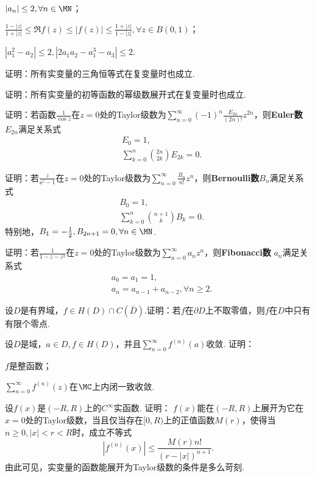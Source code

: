 \begin{xiti}
\begin{enuma}
   \item $|a_n|\le2,\forall n\in \MN$；
   \item $\frac{1-|z|}{1+|z|}\le\Re f(z)\le|f(z)|\le\frac{1+|z|}{1-|z|},\forall
   z\in B(0,1)$；
   \item $|a_1^2-a_2|\le2,|2a_1a_2-a_1^3-a_3|\le2$.
\end{enuma}
\item 证明：所有实变量的三角恒等式在复变量时也成立.
\item 证明：所有实变量的初等函数的幂级数展开式在复变量时也成立.
\item 证明：若函数$\frac1{\cos z}$在$z=0$处的Taylor级数为$\sum_{n=0}^\infty(-1)^n\frac{E_{2n}}{(2n)!}z^{2n}$，则\textbf{Euler数}
    $E_{2n}$满足关系式
    \begin{align*}
      &E_0=1,\\
      &\sum_{k=0}^n\binom{2n}{2k}E_{2k}=0.
    \end{align*}
\item 证明：若$\frac z{\ee^z-1}$在$z=0$处的Taylor级数为$\sum_{n=0}^\infty \frac{B_n}{n!}z^n$，则\textbf{Bernoulli数}$B_n$满足关系式
    \begin{align*}
    &B_0=1,\\
    &\sum_{k=0}^n\binom{n+1}kB_k=0.
    \end{align*}
特别地，$B_1=-\frac12,B_{2n+1}=0,\forall n\in \MN$.
\item 证明：若$\frac1{1-z-z^2}$在$z=0$处的Taylor级数为$\sum_{n=0}^\infty a_nz^n$，则\textbf{Fibonacci数} $a_n$满足关系式
    \begin{align*}
    &a_0=a_1=1,\\
    &a_n=a_{n-1}+a_{n-2},\forall n\ge2.
    \end{align*}
\item 设$D$是有界域，$f\in H(D)\cap C(\bar D)$.证明：若$f$在$\partial D$上不取零值，则$f$在$D$中只有有限个零点.
\item 设$D$是域，$a\in D,f\in H(D)$，并且$\sum_{n=0}^\infty f^{(n)}(a)$收敛. 证明：
\begin{enuma}
  \item $f$是整函数；
  \item $\sum_{n=0}^\infty f^{(n)}(z)$在$\MC$上内闭一致收敛.
\end{enuma}
\item 设$f(x)$是$(-R,R)$上的$C^\infty$实函数. 证明： $f(x)$能在$(-R,R)$上展开为它在$x=0$处的Taylor级数，当且仅当存在$[0,R)$上的正值函数$M(r)$，使得当$n\ge0,|x|<r<R$时，成立不等式
    \[|f^{(n)}(x)|\le\frac{M(r)n!}{(r-|x|)^{n+1}}.\]
由此可见，实变量的函数能展开为Taylor级数的条件是多么苛刻.
\end{xiti}

